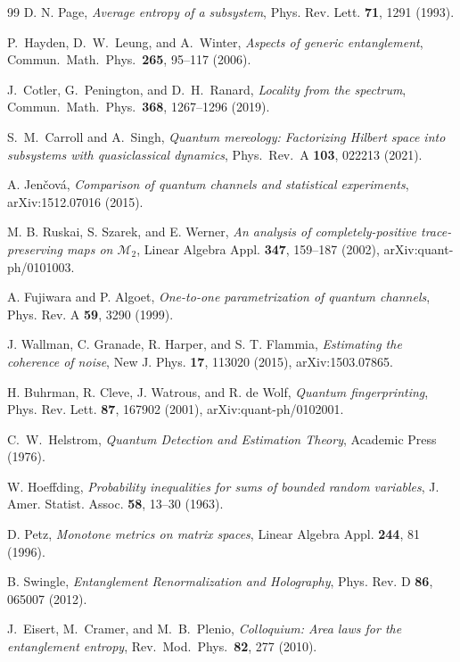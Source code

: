 \documentclass[12pt,a4paper]{article}
\begin{document}
\begin{thebibliography}{99}
D. N. Page, \emph{Average entropy of a subsystem}, Phys. Rev. Lett. \textbf{71}, 1291 (1993).

P.~Hayden, D.~W.~Leung, and A.~Winter,
\emph{Aspects of generic entanglement},
Commun.\ Math.\ Phys.\ \textbf{265}, 95--117 (2006).

J.~Cotler, G.~Penington, and D.~H.~Ranard,
\emph{Locality from the spectrum},
Commun.\ Math.\ Phys.\ \textbf{368}, 1267--1296 (2019).

S.~M.~Carroll and A.~Singh,
\emph{Quantum mereology: Factorizing Hilbert space into subsystems with quasiclassical dynamics},
Phys.\ Rev.\ A \textbf{103}, 022213 (2021).

A. Jen\v{c}ov\'a, \emph{Comparison of quantum channels and statistical experiments}, arXiv:1512.07016 (2015).

M. B. Ruskai, S. Szarek, and E. Werner, \emph{An analysis of completely-positive trace-preserving maps on $\mathcal M_2$}, Linear Algebra Appl. \textbf{347}, 159--187 (2002), arXiv:quant-ph/0101003.

A. Fujiwara and P. Algoet, \emph{One-to-one parametrization of quantum channels}, Phys. Rev. A \textbf{59}, 3290 (1999).

J. Wallman, C. Granade, R. Harper, and S. T. Flammia, \emph{Estimating the coherence of noise}, New J. Phys. \textbf{17}, 113020 (2015), arXiv:1503.07865.

H. Buhrman, R. Cleve, J. Watrous, and R. de Wolf, \emph{Quantum fingerprinting}, Phys. Rev. Lett. \textbf{87}, 167902 (2001), arXiv:quant-ph/0102001.

C.~W.~Helstrom, \emph{Quantum Detection and Estimation Theory},
Academic Press (1976).

W. Hoeffding, \emph{Probability inequalities for sums of bounded random variables}, J. Amer. Statist. Assoc. \textbf{58}, 13--30 (1963).

D. Petz, \emph{Monotone metrics on matrix spaces}, Linear Algebra Appl. \textbf{244}, 81 (1996).

B. Swingle, \emph{Entanglement Renormalization and Holography}, Phys. Rev. D \textbf{86}, 065007 (2012).

J.~Eisert, M.~Cramer, and M.~B.~Plenio,
\emph{Colloquium: Area laws for the entanglement entropy},
Rev.\ Mod.\ Phys.\ \textbf{82}, 277 (2010).


\end{thebibliography}
\end{document}
